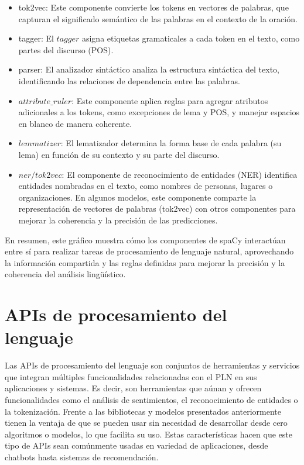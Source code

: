 \begin{itemize}
	\item tok2vec: Este componente convierte los tokens en vectores de palabras, que capturan el significado semántico de las palabras en el contexto de la oración.
	\item tagger: El $tagger$ asigna etiquetas gramaticales a cada token en el texto, como partes del discurso (POS).
	\item  parser: El analizador sintáctico analiza la estructura sintáctica del texto, identificando las relaciones de dependencia entre las palabras. 
	\item $attribute\_ruler$: Este componente aplica reglas para agregar atributos adicionales a los tokens, como excepciones de lema y POS, y manejar espacios en blanco de manera coherente.
	\item $lemmatizer$: El lematizador determina la forma base de cada palabra (su lema) en función de su contexto y su parte del discurso.
	\item $ner/tok2vec$: El componente de reconocimiento de entidades (NER) identifica entidades nombradas en el texto, como nombres de personas, lugares o organizaciones. En algunos modelos, este componente comparte la representación de vectores de palabras (tok2vec) con otros componentes para mejorar la coherencia y la precisión de las predicciones.
\end{itemize}
En resumen, este gráfico muestra cómo los componentes de spaCy interactúan entre sí para realizar tareas de procesamiento de lenguaje natural, aprovechando la información compartida y las reglas definidas para mejorar la precisión y la coherencia del análisis lingüístico.



\section{APIs de procesamiento del lenguaje}
\label{sec:apis}

Las APIs de procesamiento del lenguaje son conjuntos de herramientas y servicios que integran múltiples funcionalidades relacionadas con el PLN en sus aplicaciones y sistemas. Es decir, son herramientas que aúnan y ofrecen funcionalidades como el análisis de sentimientos, el reconocimiento de entidades o la tokenización. Frente a las bibliotecas y modelos presentados anteriormente tienen la ventaja de que se pueden usar sin necesidad de desarrollar desde cero algoritmos o modelos, lo que facilita su uso. Estas características hacen que este tipo de APIs sean comúnmente usadas en variedad de aplicaciones, desde chatbots hasta sistemas de recomendación. 

